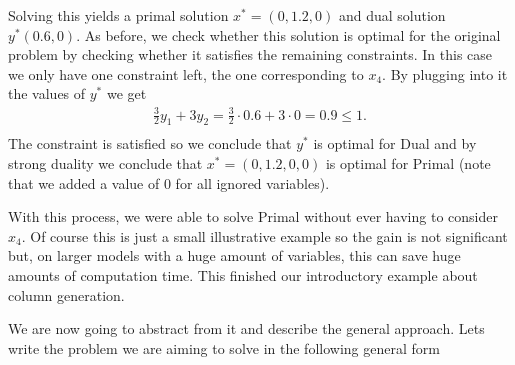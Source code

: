 \begin{center}
\end{center}

Solving this yields a primal solution $x^* = (0, 1.2, 0)$ and dual solution
$y^*(0.6, 0)$. As before, we check whether this solution is optimal for the 
original problem by checking whether it satisfies the remaining constraints.
In this case we only have one constraint left, the one corresponding to $x_4$.
By plugging into it the values of $y^*$ we get
\begin{align*}
\frac{3}{2} y_1 + 3 y_2 = \frac{3}{2} \cdot 0.6 + 3 \cdot 0 = 0.9 \leq 1. \\
\end{align*}
The constraint is satisfied so we conclude that $y^*$ is optimal for
\textsf{Dual} and by strong duality we conclude that $x^* = (0, 1.2, 0, 0)$
is optimal for \textsf{Primal} (note that we added a value of $0$ for 
all ignored variables).

With this process, we were able to solve \textsf{Primal} without ever having
to consider $x_4$. Of course this is just a small illustrative example so the gain is not
significant but, on larger models with a huge amount of variables, this can save huge amounts of computation
time. This finished our introductory example about column generation. 

We are now going to abstract from it and describe the general approach. Lets write the problem we are aiming to solve
in the following general form


